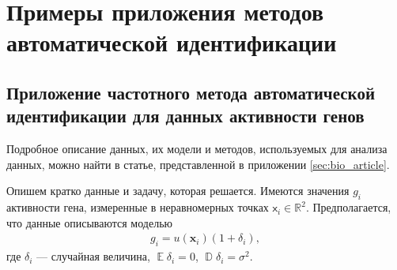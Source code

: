 \documentclass[specialist,
               substylefile = spbu.rtx,
               subf,href,colorlinks=true, 12pt]{disser}
\DeclareMathOperator{\D}{\mathbb{D}}
\def\E{\mathop{\mathbb{E}}}
\begin{document}
{{%
%





\chapter{Примеры приложения методов автоматической идентификации}
\label{sec:applications_gene}

\section{Приложение частотного метода автоматической идентификации для данных активности генов}

Подробное описание данных, их модели и методов, используемых для анализа данных, можно найти в статье, представленной в приложении \ref{sec:bio_article}.

Опишем кратко данные и задачу, которая решается. Имеются значения $g_i$ активности гена, измеренные в неравномерных точках  $\mathsf{x}_i \in \mathbb{R}^2$.
Предполагается, что данные описываются моделью
\begin{eqnarray*}
g_i = u(\mathbf{x}_i)(1 + \delta_i),
\end{eqnarray*}
где $\delta_i$ --- случайная величина, $\E\delta_i=0$, $\D\delta_i=\sigma^2$.

}}
\end{document}
